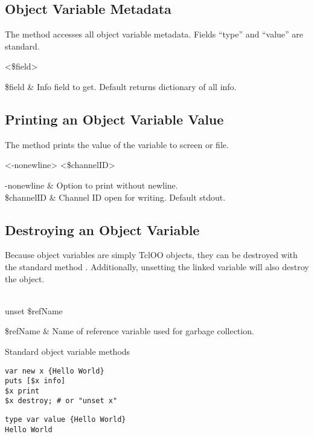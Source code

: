 \documentclass{article}
\begin{document}
\clearpage
\subsection{Object Variable Metadata}
The method  accesses all object variable metadata. 
Fields ``type'' and ``value'' are standard.
\begin{syntax}
 <\$field>
\end{syntax}
\begin{args}
\$field & Info field to get. Default returns dictionary of all info. \\
\end{args}

\subsection{Printing an Object Variable Value}
The method  prints the value of the variable to screen or file.
\begin{syntax}
 <-nonewline> <\$channelID>
\end{syntax}
\begin{args}
-nonewline & Option to print without newline. \\
\$channelID & Channel ID open for writing. Default stdout.
\end{args}

\subsection{Destroying an Object Variable}
Because object variables are simply TclOO objects, they can be destroyed with the standard method . 
Additionally, unsetting the linked variable will also destroy the object.
\begin{syntax}
 \\
unset \$refName
\end{syntax}
\begin{args}
\$refName & Name of reference variable used for garbage collection.
\end{args}

\begin{example}{Standard object variable methods}
\begin{lstlisting}
var new x {Hello World}
puts [$x info]
$x print
$x destroy; # or "unset x"
\end{lstlisting}
\tcblower
\begin{lstlisting}
type var value {Hello World}
Hello World
\end{lstlisting}
\end{example}
\end{document}
